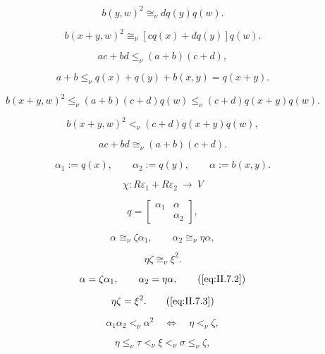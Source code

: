 \documentclass{article}
\begin{document}
$$b(y,w)^2\cong_\nu dq(y)q(w).$$

\begin{equation}\label{eq:II.6.13}
b(x+y,w)^2\cong_\nu[cq(x)+dq(y)]q(w).\end{equation}

$$ac+bd\le_\nu(a+b)(c+d),$$

$$a+b\le_\nu q(x)+q(y)+b(x,y)=q(x+y).$$

$$b(x+y,w)^2\le_\nu (a+b)(c+d)q(w)\le_\nu(c+d)q(x+y)q(w).$$

$$b(x+y,w)^2<_\nu (c+d)q(x+y)q(w),$$

$$ac+bd\cong_\nu (a+b)(c+d).$$

\begin{equation}\label{eq:II.7.1}
{\alpha}_1 := q(x), \qquad {\alpha}_2 := q(y), \qquad {\alpha} := b(x,y).
\end{equation}

$$\chi : R {\varepsilon}_1 + R {\varepsilon}_2 {\ {\to} \ } V$$

$$ q = \begin{bmatrix} {\alpha}_1& {\alpha}\\   &   {\alpha}_2\end{bmatrix}, $$

\begin{equation}\label{eq:II.7.2}
  {\alpha} \cong_\nu {\zeta} {\alpha}_1, \qquad {\alpha}_2 \cong_\nu \eta {\alpha},
  \end{equation}

\begin{equation}\label{eq:II.7.3}
  \eta {\zeta}  \cong_\nu {\xi}^2.
  \end{equation}

\begin{equation}
  {\alpha} = {\zeta} {\alpha}_1, \qquad {\alpha}_2 = \eta {\alpha},
\tag{\ref{eq:II.7.2}}\end{equation}

\begin{equation}
  \eta {\zeta} =  {\xi}^2.
\tag{\ref{eq:II.7.3}}\end{equation}

\begin{equation}\label{eq:II.7.4}
{\alpha}_1 {\alpha}_2 {<_\nu} {\alpha}^2 {\quad {\iff} \quad } \eta {<_\nu} {\zeta},
\end{equation}

\begin{equation}\label{eq:II.7.5}
\eta {\leq_\nu} \tau {<_\nu} {\xi} {<_\nu} {\sigma} {\leq_\nu} {\zeta},
\end{equation}
\end{document}
